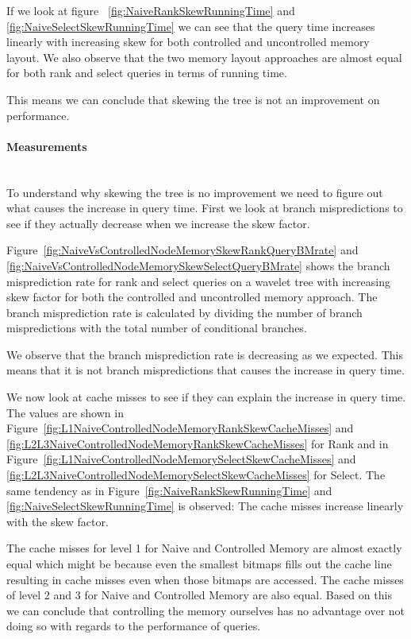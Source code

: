 If we look at figure ~\ref{fig:NaiveRankSkewRunningTime} and \ref{fig:NaiveSelectSkewRunningTime} we can see that the query time increases linearly with increasing skew for both controlled and uncontrolled memory layout. We also observe that the two memory layout approaches are almost equal for both rank and select queries in terms of running time.

This means we can conclude that skewing the tree is not an improvement on performance.

\paragraph{Measurements}~\\
To understand why skewing the tree is no improvement we need to figure out what causes the increase in query time. 
First we look at branch mispredictions to see if they actually decrease when we increase the skew factor.%

 
Figure~\ref{fig:NaiveVsControlledNodeMemorySkewRankQueryBMrate} and \ref{fig:NaiveVsControlledNodeMemorySkewSelectQueryBMrate} shows the branch misprediction rate for rank and select queries on a wavelet tree with increasing skew factor for both the controlled and uncontrolled memory approach. 
The branch misprediction rate is calculated by dividing the number of branch mispredictions with the total number of conditional branches.

We observe that the branch misprediction rate is decreasing as we expected. 
This means that it is not branch mispredictions that causes the increase in query time. 

We now look at cache misses to see if they can explain the increase in query time. 
The values are shown in Figure~\ref{fig:L1NaiveControlledNodeMemoryRankSkewCacheMisses} and \ref{fig:L2L3NaiveControlledNodeMemoryRankSkewCacheMisses} for Rank and in Figure~\ref{fig:L1NaiveControlledNodeMemorySelectSkewCacheMisses} and \ref{fig:L2L3NaiveControlledNodeMemorySelectSkewCacheMisses} for Select.
The same tendency as in Figure~\ref{fig:NaiveRankSkewRunningTime} and \ref{fig:NaiveSelectSkewRunningTime} is observed: 
The cache misses increase linearly with the skew factor.

The cache misses for level 1 for Naive and Controlled Memory are almost exactly equal which might be because even the smallest bitmaps fills out the cache line resulting in cache misses even when those bitmaps are accessed. 
The cache misses of level 2 and 3 for Naive and Controlled Memory are also equal. 
Based on this we can conclude that controlling the memory ourselves has no advantage over not doing so with regards to the performance of queries.


